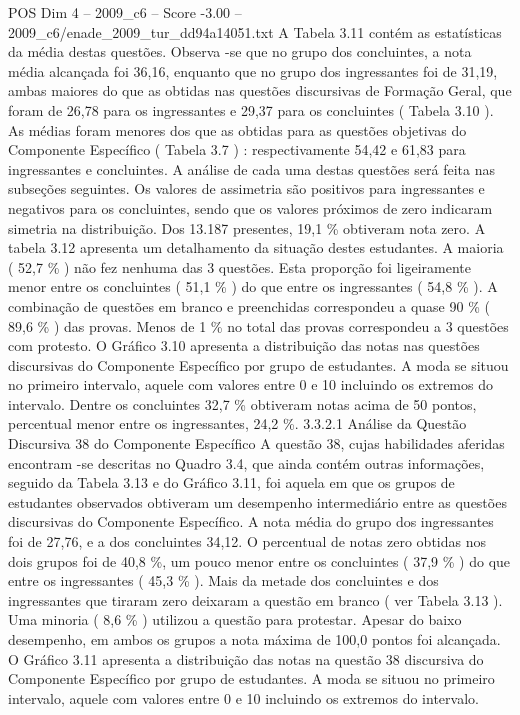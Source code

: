 \begin{textsample}{POS Dim 4 – 2009\_c6 – Score -3.00 – 2009\_c6/enade\_2009\_tur\_dd94a14051.txt}
A Tabela 3.11 contém as estatísticas da média destas questões.
Observa -se que no grupo dos concluintes, a nota média alcançada foi 36,16, enquanto que no grupo dos ingressantes foi de 31,19, ambas maiores do que as obtidas nas questões discursivas de Formação Geral, que foram de 26,78 para os ingressantes e 29,37 para os concluintes ( Tabela 3.10 ).
As médias foram menores dos que as obtidas para as questões objetivas do Componente Específico ( Tabela 3.7 ) : respectivamente 54,42 e 61,83 para ingressantes e concluintes.
A análise de cada uma destas questões será feita nas subseções seguintes.
Os valores de assimetria são positivos para ingressantes e negativos para os concluintes, sendo que os valores próximos de zero indicaram simetria na distribuição.
Dos 13.187 presentes, 19,1 \% obtiveram nota zero.
A tabela 3.12 apresenta um detalhamento da situação destes estudantes.
A maioria ( 52,7 \% ) não fez nenhuma das 3 questões.
Esta proporção foi ligeiramente menor entre os concluintes ( 51,1 \% ) do que entre os ingressantes ( 54,8 \% ).
A combinação de questões em branco e preenchidas correspondeu a quase 90 \% ( 89,6 \% ) das provas.
Menos de 1 \% no total das provas correspondeu a 3 questões com protesto.
O Gráfico 3.10 apresenta a distribuição das notas nas questões discursivas do Componente Específico por grupo de estudantes.
A moda se situou no primeiro intervalo, aquele com valores entre 0 e 10 incluindo os extremos do intervalo.
Dentre os concluintes 32,7 \% obtiveram notas acima de 50 pontos, percentual menor entre os ingressantes, 24,2 \%. 3.3.2.1 Análise da Questão Discursiva 38 do Componente Específico A questão 38, cujas habilidades aferidas encontram -se descritas no Quadro 3.4, que ainda contém outras informações, seguido da Tabela 3.13 e do Gráfico 3.11, foi aquela em que os grupos de estudantes observados obtiveram um desempenho intermediário entre as questões discursivas do Componente Específico.
A nota média do grupo dos ingressantes foi de 27,76, e a dos concluintes 34,12.
O percentual de notas zero obtidas nos dois grupos foi de 40,8 \%, um pouco menor entre os concluintes ( 37,9 \% ) do que entre os ingressantes ( 45,3 \% ).
Mais da metade dos concluintes e dos ingressantes que tiraram zero deixaram a questão em branco ( ver Tabela 3.13 ).
Uma minoria ( 8,6 \% ) utilizou a questão para protestar.
Apesar do baixo desempenho, em ambos os grupos a nota máxima de 100,0 pontos foi alcançada.
O Gráfico 3.11 apresenta a distribuição das notas na questão 38 discursiva do Componente Específico por grupo de estudantes.
A moda se situou no primeiro intervalo, aquele com valores entre 0 e 10 incluindo os extremos do intervalo.

\end{textsample}

